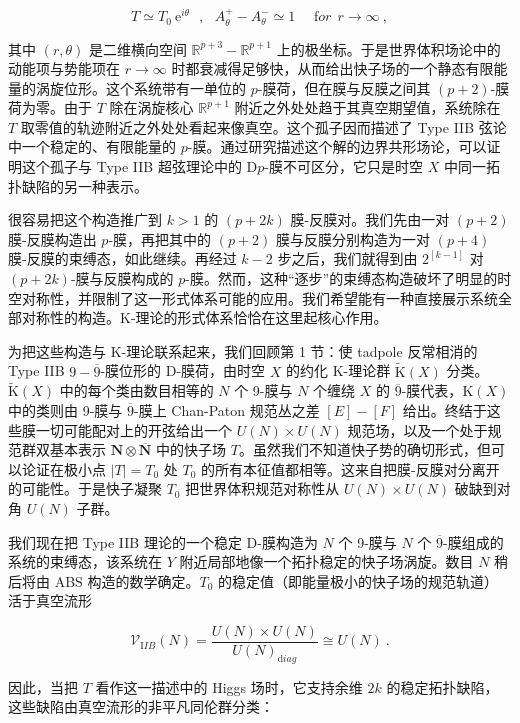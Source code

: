 \documentclass[11pt,a4paper]{ctexart}
\begin{document}
\[T\simeq T_0~\mbox{e}^{i\theta}~~~,~~~A_\theta^+-A_\theta^-\simeq1~~~~~~{\mathrm for}
{}~~r\to\infty \ ,\]

其中 \((r,\theta)\) 是二维横向空间 \({\mathbb{R}}^{p+3}-{\mathbb{R}}^{p+1}\) 上的极坐标。于是世界体积场论中的动能项与势能项在 \(r\to\infty\) 时都衰减得足够快，从而给出快子场的一个静态有限能量的涡旋位形。这个系统带有一单位的 \(p\)-膜荷，但在膜与反膜之间其 \((p+2)\)-膜荷为零。由于 \(T\) 除在涡旋核心 \({\mathbb{R}}^{p+1}\) 附近之外处处趋于其真空期望值，系统除在 \(T\) 取零值的轨迹附近之外处处看起来像真空。这个孤子因而描述了 Type IIB 弦论中一个稳定的、有限能量的 \(p\)-膜。通过研究描述这个解的边界共形场论，可以证明这个孤子与 Type IIB 超弦理论中的 D\(p\)-膜不可区分，它只是时空 \(X\) 中同一拓扑缺陷的另一种表示。

很容易把这个构造推广到 \(k>1\) 的 \((p+2k)\) 膜-反膜对。我们先由一对 \((p+2)\) 膜-反膜构造出 \(p\)-膜，再把其中的 \((p+2)\) 膜与反膜分别构造为一对 \((p+4)\) 膜-反膜的束缚态，如此继续。再经过 \(k-2\) 步之后，我们就得到由 \(2^[k-1]\) 对 \((p+2k)\)-膜与反膜构成的 \(p\)-膜。然而，这种``逐步''的束缚态构造破坏了明显的时空对称性，并限制了这一形式体系可能的应用。我们希望能有一种直接展示系统全部对称性的构造。K-理论的形式体系恰恰在这里起核心作用。

为把这些构造与 K-理论联系起来，我们回顾第 1 节：使 tadpole 反常相消的 Type IIB \(9-\overline{9}\)-膜位形的 D-膜荷，由时空 \(X\) 的约化 K-理论群 \(\widetilde{{\mathrm K}}(X)\) 分类。\(\widetilde{{\mathrm K}}(X)\) 中的每个类由数目相等的 \(N\) 个 9-膜与 \(N\) 个缠绕 \(X\) 的 \(\overline{9}\)-膜代表，\({\mathrm K}(X)\) 中的类则由 9-膜与 \(\overline{9}\)-膜上 Chan-Paton 规范丛之差 \([E]-[F]\) 给出。终结于这些膜一切可能配对上的开弦给出一个 \(U(N)\times U(N)\) 规范场，以及一个处于规范群双基本表示 \({\mathbf N}\otimes\overline{\mathbf N}\) 中的快子场 \(T\)。虽然我们不知道快子势的确切形式，但可以论证在极小点 \(|T|=T_0\) 处 \(T_0\) 的所有本征值都相等。这来自把膜-反膜对分离开的可能性。于是快子凝聚 \(T_0\) 把世界体积规范对称性从 \(U(N)\times U(N)\) 破缺到对角 \(U(N)\) 子群。

我们现在把 Type IIB 理论的一个稳定 D-膜构造为 \(N\) 个 9-膜与 \(N\) 个 \(\overline{9}\)-膜组成的系统的束缚态，该系统在 \(Y\) 附近局部地像一个拓扑稳定的快子场涡旋。数目 \(N\) 稍后将由 ABS 构造的数学确定。\(T_0\) 的稳定值（即能量极小的快子场的规范轨道）活于真空流形

\[{\mathcal V}_{\mathrm IIB}(N)=\frac{U(N)\times U(N)}{U(N)_{\mathrm diag}}\cong U(N)\ .\]

因此，当把 \(T\) 看作这一描述中的 Higgs 场时，它支持余维 \(2k\) 的稳定拓扑缺陷，这些缺陷由真空流形的非平凡同伦群分类：
\end{document}
